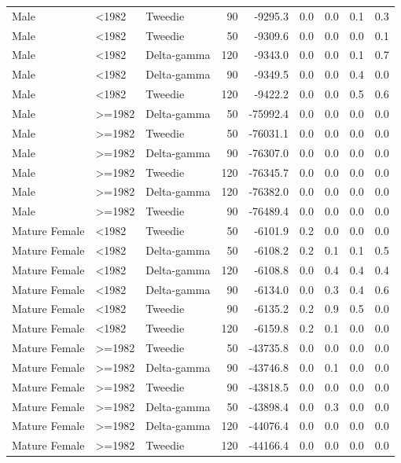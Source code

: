\documentclass[
]{article}
\begin{document}
\begin{table}
{\begin{tabular}[t]{lllrrrrrr}
Male & <1982 & Tweedie & 90 & -9295.3 & 0.0 & 0.0 & 0.1 & 0.3\\
Male & <1982 & Tweedie & 50 & -9309.6 & 0.0 & 0.0 & 0.0 & 0.1\\
\addlinespace
Male & <1982 & Delta-gamma & 120 & -9343.0 & 0.0 & 0.0 & 0.1 & 0.7\\
Male & <1982 & Delta-gamma & 90 & -9349.5 & 0.0 & 0.0 & 0.4 & 0.0\\
Male & <1982 & Tweedie & 120 & -9422.2 & 0.0 & 0.0 & 0.5 & 0.6\\
Male & >=1982 & Delta-gamma & 50 & -75992.4 & 0.0 & 0.0 & 0.0 & 0.0\\
Male & >=1982 & Tweedie & 50 & -76031.1 & 0.0 & 0.0 & 0.0 & 0.0\\
\addlinespace
Male & >=1982 & Delta-gamma & 90 & -76307.0 & 0.0 & 0.0 & 0.0 & 0.0\\
Male & >=1982 & Tweedie & 120 & -76345.7 & 0.0 & 0.0 & 0.0 & 0.0\\
Male & >=1982 & Delta-gamma & 120 & -76382.0 & 0.0 & 0.0 & 0.0 & 0.0\\
Male & >=1982 & Tweedie & 90 & -76489.4 & 0.0 & 0.0 & 0.0 & 0.0\\
Mature Female & <1982 & Tweedie & 50 & -6101.9 & 0.2 & 0.0 & 0.0 & 0.0\\
\addlinespace
Mature Female & <1982 & Delta-gamma & 50 & -6108.2 & 0.2 & 0.1 & 0.1 & 0.5\\
Mature Female & <1982 & Delta-gamma & 120 & -6108.8 & 0.0 & 0.4 & 0.4 & 0.4\\
Mature Female & <1982 & Delta-gamma & 90 & -6134.0 & 0.0 & 0.3 & 0.4 & 0.6\\
Mature Female & <1982 & Tweedie & 90 & -6135.2 & 0.2 & 0.9 & 0.5 & 0.0\\
Mature Female & <1982 & Tweedie & 120 & -6159.8 & 0.2 & 0.1 & 0.0 & 0.0\\
\addlinespace
Mature Female & >=1982 & Tweedie & 50 & -43735.8 & 0.0 & 0.0 & 0.0 & 0.0\\
Mature Female & >=1982 & Delta-gamma & 90 & -43746.8 & 0.0 & 0.1 & 0.0 & 0.0\\
Mature Female & >=1982 & Tweedie & 90 & -43818.5 & 0.0 & 0.0 & 0.0 & 0.0\\
Mature Female & >=1982 & Delta-gamma & 50 & -43898.4 & 0.0 & 0.3 & 0.0 & 0.0\\
Mature Female & >=1982 & Delta-gamma & 120 & -44076.4 & 0.0 & 0.0 & 0.0 & 0.0\\
\addlinespace
Mature Female & >=1982 & Tweedie & 120 & -44166.4 & 0.0 & 0.0 & 0.0 & 0.0\\
\bottomrule
\end{tabular}}
\end{table}
\end{document}
